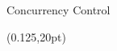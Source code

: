 \begin{frame}[t]{Concurrency Control}
\begin{textblock*}{\paperwidth} (0.125\paperwidth,20pt)
\end{textblock*}
\end{frame}

